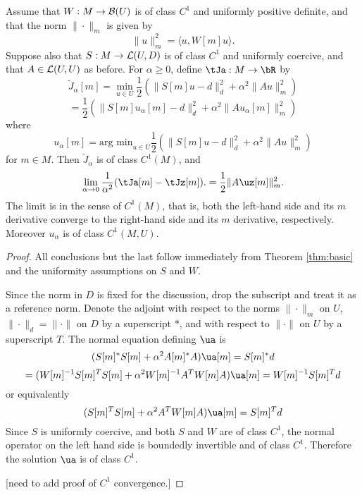 \begin{theorem}
  \label{thm:uniform}
Assume that $W: M \rightarrow {\cal B}(U)$ is of class $C^1$ and uniformly positive definite, and that the norm $\|\cdot\|_m$ is given by
\begin{equation}
  \label{eqn:normdef}
  \|u\|_m^2 = \langle u, W[m] u \rangle.
\end{equation}
Suppose also that $S: M \rightarrow {\cal L}(U,D)$ is of class $C^1$ and uniformly coercive, and that $A \in {\cal L}(U,U)$ as before. For $\alpha \ge 0$, define $\tJa: M \rightarrow \bR$ by
\[
  \tilde{J}_{\alpha}[m] = \min_{u \in U}\frac{1}{2}(\|S[m]u-d\|^2_d + \alpha^2\|Au\|_m^2)
\]
\begin{equation}
  \label{eqn:tjadef}
  = \frac{1}{2}(\|S[m]u_{\alpha}[m]-d\|^2_d + \alpha^2\|Au_{\alpha}[m]\|_m^2)
\end{equation}
where
\begin{equation}
  \label{eqn:ua}
  u_{\alpha}[m] = \mbox{arg min}_{u \in U}\frac{1}{2}(\|S[m]u-d\|^2_d + \alpha^2\|Au\|_m^2)
\end{equation}
for $m \in M$. Then $\tilde{J}_{\alpha}$ is of class $C^1(M)$, and
\begin{equation}
  \label{eqn:lim}
  \lim_{\alpha \rightarrow 0} \frac{1}{\alpha^2}  (\tJa[m]-\tJz[m]).= \frac{1}{2}\|A\uz[m]\|_m^2.
\end{equation}
The limit is in the sense of $C^1(M)$, that is, both the left-hand side and its $m$ derivative converge to the right-hand side and its $m$ derivative, respectively. Moreover $u_{\alpha}$ is of class $C^1(M,U)$.
\end{theorem}

\begin{proof} All conclusions but the last follow immediately from Theorem \ref{thm:basic} and the uniformity assumptions on $S$ and $W$.

Since the norm in $D$ is fixed for the discussion, drop the subscript and treat it as a reference norm. Denote the adjoint with respect to the norms $\|\cdot\|_m$ on $U$, $\|\cdot\|_d = \|\cdot\|$ on $D$ by a superscript $*$, and with respect to $\|\cdot\|$ on $U$ by a superscript $T$. The normal equation defining $\ua$ is
  \[
    (S[m]^*S[m] + \alpha^2 A[m]^*A) \ua[m] = S[m]^*d
  \]
  \begin{equation}
    \label{eqn:normal}
= (W[m]^{-1}S[m]^TS[m] + \alpha^2 W[m]^{-1}A^TW[m]A)\ua[m]= W[m]^{-1}S[m]^Td
\end{equation}
or equivalently
\begin{equation}
  \label{eqn:normal1}
  (S[m]^TS[m] + \alpha^2 A^TW[m]A)\ua[m] = S[m]^Td
\end{equation}
Since $S$ is uniformly coercive, and both $S$ and $W$ are of class $C^1$, the normal operator on the left hand side is boundedly invertible and of class $C^1$. Therefore the solution $\ua$ is of class $C^1$.

[need to add proof of $C^1$ convergence.]
\end{proof}


